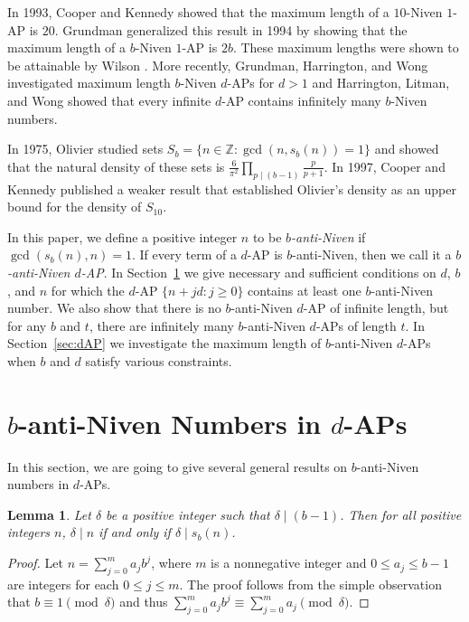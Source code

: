 \documentclass[12pt]{article}
\newtheorem{lemma}[theorem]{Lemma}
\theoremstyle{definition}
\begin{document}
In 1993, Cooper and Kennedy \cite{ck1} showed that the maximum length of a $10$-Niven $1$-AP is $20$.  Grundman \cite{g} generalized this result in 1994 by showing that the maximum length of a $b$-Niven $1$-AP is $2b$.  These maximum lengths were shown to be attainable by Wilson \cite{w}.  More recently, Grundman, Harrington, and Wong \cite{ghw} investigated maximum length $b$-Niven $d$-APs for $d>1$ and Harrington, Litman, and Wong \cite{hlw} showed that every infinite $d$-AP contains infinitely many $b$-Niven numbers.

In 1975, Olivier \cite{olivier} studied sets $S_b=\{n\in\mathbb{Z}:\gcd(n,s_b(n))=1\}$ and showed that the natural density of these sets is $\frac{6}{\pi^2}\prod_{p\mid(b-1)}\frac{p}{p+1}$.  In 1997, Cooper and Kennedy \cite{ck2} published a weaker result that established Olivier's density as an upper bound for the density of $S_{10}$.

In this paper, we define a positive integer $n$ to be \emph{$b$-anti-Niven} if $\gcd(s_b(n),n)=1$.  If every term of a $d$-AP is $b$-anti-Niven, then we call it a \emph{$b$-anti-Niven $d$-AP}.  In Section~\ref{sec:general} we give necessary and sufficient conditions on $d$, $b$, and $n$ for which the $d$-AP $\{n+jd:j\geq 0\}$ contains at least one $b$-anti-Niven number.  We also show that there is no $b$-anti-Niven $d$-AP of infinite length, but for any $b$ and $t$, there are infinitely many $b$-anti-Niven $d$-APs of length $t$.  In Section~\ref{sec:dAP} we investigate the maximum length of $b$-anti-Niven $d$-APs when $b$ and $d$ satisfy various constraints.





\section{$b$-anti-Niven Numbers in $d$-APs}\label{sec:general}
In this section, we are going to give several general results on $b$-anti-Niven numbers in $d$-APs. 

\begin{lemma}\label{lem:b-1}
Let $\delta$ be a positive integer such that $\delta\mid(b-1)$. Then for all positive integers $n$, $\delta\mid n$ if and only if $\delta\mid s_b(n)$.
\end{lemma}
\begin{proof}
Let $n=\sum_{j=0}^m a_j b^j$, where $m$ is a nonnegative integer and $0\leq a_j \leq b-1$ are integers for each $0\leq j\leq m$. The proof follows from the simple observation that $b\equiv1\pmod{\delta}$ and thus $\sum_{j=0}^m a_j b^j\equiv\sum_{j=0}^m a_j\pmod{\delta}$.
\end{proof}
\end{document}
